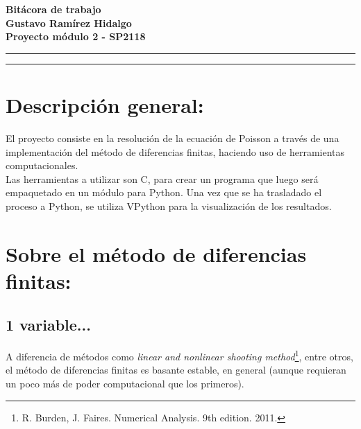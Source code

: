 \documentclass[letter]{article}
\newcommand{\entitle}[1]{
  \vspace{0.3cm}%
  \noindent%
  \textbf{#1}%
  \vspace{0.2cm}%
  \hrule\vspace*{0.5mm}%
  \noindent%
  \rule{\linewidth}{0.5mm}%
  \vspace{0.5cm}%
}%
\begin{document}

\newcommand{\uic}{blue} %
\newcommand{\uim}{\_\_} %
\newcommand{\userinput}[1]{\textcolor{\uic}{\uim#1\uim}}
























\begin{center}
\entitle{Bitácora de trabajo \\ Gustavo Ramírez Hidalgo \\ Proyecto módulo 2 - SP2118}
\end{center}


\section{Descripción general:}
El proyecto consiste en la resolución de la ecuación de Poisson a través de una implementación del método de diferencias finitas, haciendo uso de herramientas computacionales.\\
Las herramientas a utilizar son C, para crear un programa que luego será empaquetado en un módulo para Python. Una vez que se ha trasladado el proceso a Python, se utiliza VPython para la visualización de los resultados.


\section{Sobre el método de diferencias finitas:}

\subsection{1 variable...}

A diferencia de métodos como \textit{linear and nonlinear shooting method}\footnote{R. Burden, J. Faires. Numerical Analysis. 9th edition. 2011.}, entre otros, el método de diferencias finitas es basante estable, en general (aunque requieran un poco más de poder computacional que los primeros).
\end{document}
